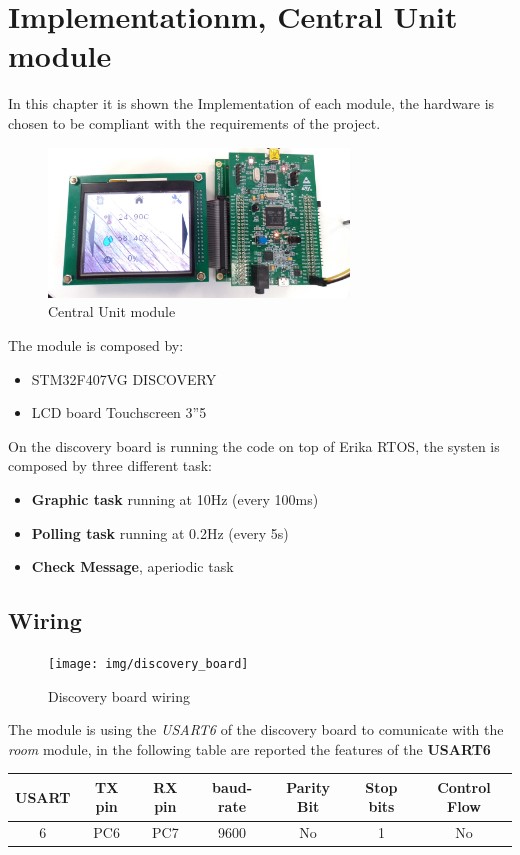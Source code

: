 \newpage
\section{Implementationm, Central Unit module}
In this chapter it is shown the Implementation of each module, the hardware is chosen
to be compliant with the requirements of the project.

\begin{figure}[h]
	\centering
	\includegraphics[width=8cm,keepaspectratio]{img/CentralUnit}
	\caption{Central Unit module}
	\label{fig:CentralUnit}
\end{figure}

The module is composed by:
\begin{itemize}
	\item STM32F407VG DISCOVERY
	\item LCD board Touchscreen 3”5
\end{itemize}


On the discovery board is running the code on top of Erika RTOS, the systen is composed by three different task:
\begin{itemize}
	\item \textbf{Graphic task} running at 10Hz (every 100ms)
	\item \textbf{Polling task} running at 0.2Hz (every 5s)
	\item \textbf{Check Message}, aperiodic task
\end{itemize}

\subsection{Wiring}

\begin{figure}[h]
	\centering
	\texttt{[image: img/discovery\_board]}
	\caption{Discovery board wiring}
	\label{fig:dicovery}
\end{figure}

The module is using the \textit{USART6} of the discovery board to comunicate with the \textit{room} module, in the following table are reported the features of the \textbf{USART6}
\begin{center}
	\begin{tabular}{||c | c | c | c | c | c | c ||} 
		\hline
		USART 	& TX pin 	& RX pin	& baud-rate & Parity Bit & Stop bits & Control Flow \\ 
		\hline
		6		&	PC6		& PC7 		& 9600 & No & 1 & No	\\ 
		\hline
	\end{tabular}
\end{center}



